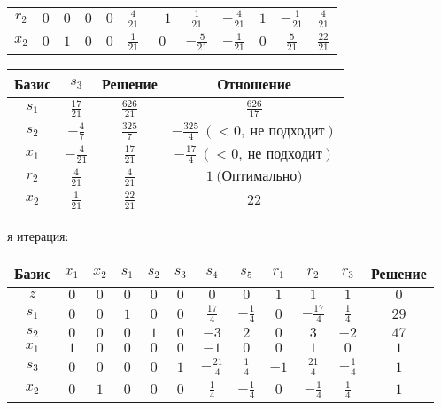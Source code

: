 \documentclass{article}%
\begin{document}
\begin{flushleft}
\begin{tabular}{|c|cccccccccc|c|}
$r_{2}$&$0$&$0$&$0$&$0$&$\frac{4}{21}$&$-1$&$\frac{1}{21}$&$-\frac{4}{21}$&$1$&$-\frac{1}{21}$&$\frac{4}{21}$\\%
$x_{2}$&$0$&$1$&$0$&$0$&$\frac{1}{21}$&$0$&$-\frac{5}{21}$&$-\frac{1}{21}$&$0$&$\frac{5}{21}$&$\frac{22}{21}$\\%
\hline%
\end{tabular}%
\newline%
\newline%
\newline%
\begin{tabular}{|cccc|}%
\hline%
Базис&$s_{3}$&Решение&Отношение\\%
\hline%
$s_{1}$&$\frac{17}{21}$&$\frac{626}{21}$&$\frac{626}{17}$\\%
$s_{2}$&$-\frac{4}{7}$&$\frac{325}{7}$&$-\frac{325}{4}\: (< 0, \: \text{не подходит})$\\%
$x_{1}$&$-\frac{4}{21}$&$\frac{17}{21}$&$-\frac{17}{4}\: (< 0, \: \text{не подходит})$\\%
$r_{2}$&$\frac{4}{21}$&$\frac{4}{21}$&$1\: \text{(Оптимально)}$\\%
$x_{2}$&$\frac{1}{21}$&$\frac{22}{21}$&$22$\\%
\hline%
\end{tabular}%
\newline%
\newline%
я итерация: %
\newline%
\newline%
\renewcommand{\arraystretch}{1.3}%
\begin{tabular}{|c|cccccccccc|c|}%
\hline%
Базис&$x_{1}$&$x_{2}$&$s_{1}$&$s_{2}$&$s_{3}$&$s_{4}$&$s_{5}$&$r_{1}$&$r_{2}$&$r_{3}$&Решение\\%
\hline%
$z$&$0$&$0$&$0$&$0$&$0$&$0$&$0$&$1$&$1$&$1$&$0$\\%
\hline%
$s_{1}$&$0$&$0$&$1$&$0$&$0$&$\frac{17}{4}$&$-\frac{1}{4}$&$0$&$-\frac{17}{4}$&$\frac{1}{4}$&$29$\\%
$s_{2}$&$0$&$0$&$0$&$1$&$0$&$-3$&$2$&$0$&$3$&$-2$&$47$\\%
$x_{1}$&$1$&$0$&$0$&$0$&$0$&$-1$&$0$&$0$&$1$&$0$&$1$\\%
$s_{3}$&$0$&$0$&$0$&$0$&$1$&$-\frac{21}{4}$&$\frac{1}{4}$&$-1$&$\frac{21}{4}$&$-\frac{1}{4}$&$1$\\%
$x_{2}$&$0$&$1$&$0$&$0$&$0$&$\frac{1}{4}$&$-\frac{1}{4}$&$0$&$-\frac{1}{4}$&$\frac{1}{4}$&$1$\\%
\hline%
\end{tabular}%
\newline%

\end{flushleft}
\end{document}
